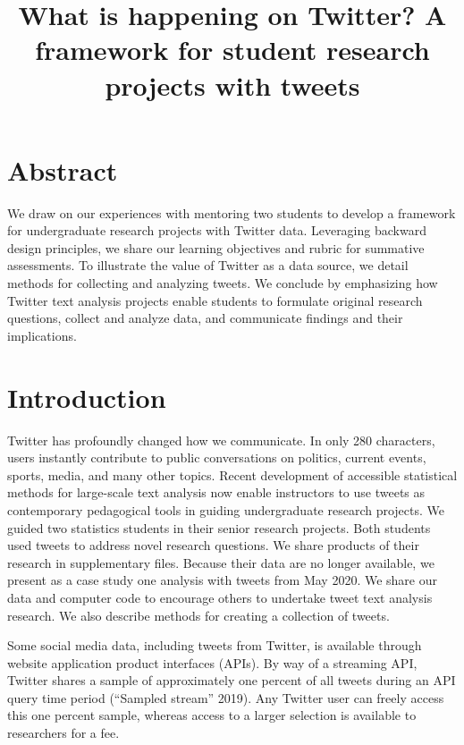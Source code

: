 \documentclass[
]{article}
\title{What is happening on Twitter? A framework for student research projects with tweets}
\author{}
\date{\vspace{-2.5em}}
\begin{document}
\maketitle

\hypertarget{abstract}{%
\section{Abstract}\label{abstract}}

We draw on our experiences with mentoring two students to develop a framework for undergraduate research projects with Twitter data.
Leveraging backward design principles, we share our learning objectives and
rubric for summative assessments. To illustrate the value of Twitter as a data source,
we detail methods for collecting and analyzing tweets. We conclude by emphasizing
how Twitter text analysis projects enable students to formulate
original research questions, collect and analyze data, and communicate
findings and their implications.

\hypertarget{introduction}{%
\section{Introduction}\label{introduction}}

Twitter has profoundly changed how we communicate.
In only 280 characters, users instantly contribute to public conversations on politics,
current events, sports, media, and many other topics.
Recent development of accessible statistical methods for large-scale text
analysis now enable instructors to use tweets as contemporary pedagogical
tools in guiding undergraduate research projects.
We guided two statistics students in their senior research projects.
Both students used tweets to address novel research questions. We
share products of their research in supplementary files. Because
their data are no longer available, we present as a case study one
analysis with tweets from May 2020. We share our data and computer
code to encourage others to undertake
tweet text analysis research. We also describe methods for creating a
collection of tweets.

Some social media data, including tweets from Twitter, is
available through website application product interfaces (APIs).
By way of a streaming API, Twitter shares a sample of approximately
one percent of all
tweets during an API query time period (``Sampled stream'' 2019). Any Twitter
user can freely
access this one percent sample, whereas access to a larger selection is available to
researchers for a fee.
\end{document}
